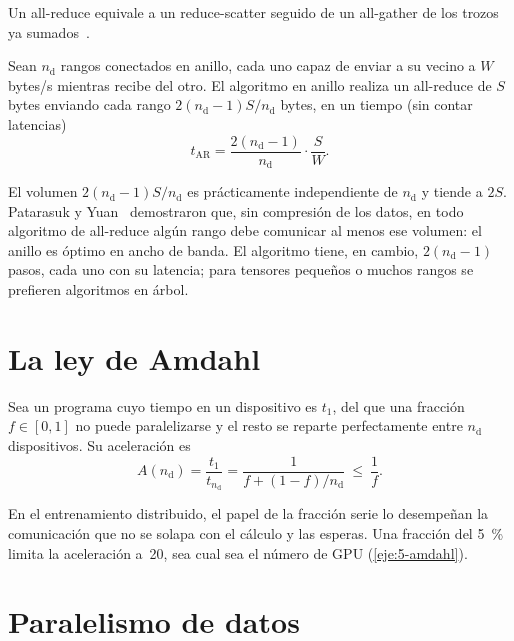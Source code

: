 Un all-reduce equivale a un reduce-scatter seguido de un all-gather de los trozos ya sumados~\cite{cs336}.

\begin{proposicion}\label{prop:anillo}
Sean $n_{\mathrm{d}}$ rangos conectados en anillo, cada uno capaz de enviar a su vecino a $W$ bytes/s mientras recibe del otro. El algoritmo en anillo realiza un all-reduce de $S$ bytes enviando cada rango $2(n_{\mathrm{d}}-1)S/n_{\mathrm{d}}$ bytes, en un tiempo (sin contar latencias)
\[
t_{\mathrm{AR}}=\frac{2(n_{\mathrm{d}}-1)}{n_{\mathrm{d}}}\cdot\frac{S}{W}.
\]
\end{proposicion}

\addtocounter{figure}{1}%

\begin{observacion}
El volumen $2(n_{\mathrm{d}}-1)S/n_{\mathrm{d}}$ es prácticamente independiente de $n_{\mathrm{d}}$ y tiende a $2S$. Patarasuk y Yuan~\cite{patarasuk} demostraron que, sin compresión de los datos, en todo algoritmo de all-reduce algún rango debe comunicar al menos ese volumen: el anillo es óptimo en ancho de banda. El algoritmo tiene, en cambio, $2(n_{\mathrm{d}}-1)$ pasos, cada uno con su latencia; para tensores pequeños o muchos rangos se prefieren algoritmos en árbol.
\end{observacion}

\section{La ley de Amdahl}

\begin{teorema}\label{teo:amdahl}
Sea un programa cuyo tiempo en un dispositivo es $t_1$, del que una fracción $f\in[0,1]$ no puede paralelizarse y el resto se reparte perfectamente entre $n_{\mathrm{d}}$ dispositivos. Su aceleración es
\[
A(n_{\mathrm{d}})=\frac{t_1}{t_{n_{\mathrm{d}}}}=\frac{1}{f+(1-f)/n_{\mathrm{d}}}\ \le\ \frac{1}{f}.
\]
\end{teorema}

En el entrenamiento distribuido, el papel de la fracción serie lo desempeñan la comunicación que no se solapa con el cálculo y las esperas. Una fracción del 5~\% limita la aceleración a~20, sea cual sea el número de GPU (\cref{eje:5-amdahl}).

\section{Paralelismo de datos}

